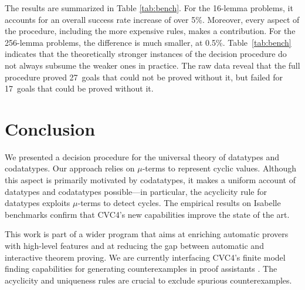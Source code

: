 \documentclass[letter]{article}
\theoremstyle{plain}
\theoremstyle{definition}
\begin{document}
The results are summarized in Table \ref{tab:bench}.
For the 16-lemma problems, it accounts for an overall
success rate increase of over 5\%.
Moreover, every aspect of the procedure, including the
more expensive rules, makes a contribution.
%
For the 256-lemma problems, the difference
is much smaller, at 0.5\%.
Table~\ref{tab:bench} indicates that
the theoretically stronger instances of the decision
procedure do not always subsume the weaker ones in practice.
The raw data reveal that the full procedure proved 27~goals that
could not be proved without it, but failed for 17~goals that could be proved
without it.

\section{Conclusion}
\label{sec:conclusion}

We presented a decision procedure for the universal theory of datatypes and
codatatypes. Our approach relies on $\mu$-terms to represent cyclic values.
Although this aspect is primarily motivated by codatatypes, it makes
a uniform account of datatypes and codatatypes possible---in particular,
the acyclicity rule for datatypes exploits $\mu$-terms to detect cycles.
The empirical results on Isabelle benchmarks
confirm that CVC4's new capabilities improve the state of the art.

This work is part of a wider program that aims at enriching automatic provers
with high-level features and at reducing the gap between automatic and
interactive theorem proving.
We are currently interfacing CVC4's finite model finding capabilities
for generating counterexamples in proof assistants
\cite{reynolds-et-al-2015-smt}.
The acyclicity and uniqueness rules are
crucial to exclude spurious counterexamples.
\end{document}
